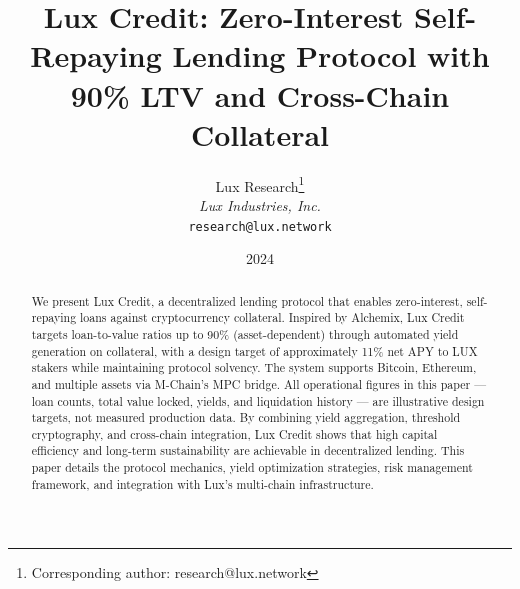 \documentclass[11pt,a4paper]{article}
\title{Lux Credit: Zero-Interest Self-Repaying Lending Protocol with 90\% LTV and Cross-Chain Collateral}
\author{
Lux Research\thanks{Corresponding author: research@lux.network}\\
\textit{Lux Industries, Inc.}\\
\texttt{research@lux.network}
}
\date{2024}
\begin{document}
\luxcoverpage
\begin{abstract}
We present Lux Credit, a decentralized lending protocol that enables zero-interest, self-repaying loans against cryptocurrency collateral. Inspired by Alchemix, Lux Credit targets loan-to-value ratios up to 90\% (asset-dependent) through automated yield generation on collateral, with a design target of approximately 11\% net APY to LUX stakers while maintaining protocol solvency. The system supports Bitcoin, Ethereum, and multiple assets via M-Chain's MPC bridge. All operational figures in this paper --- loan counts, total value locked, yields, and liquidation history --- are illustrative design targets, not measured production data. By combining yield aggregation, threshold cryptography, and cross-chain integration, Lux Credit shows that high capital efficiency and long-term sustainability are achievable in decentralized lending. This paper details the protocol mechanics, yield optimization strategies, risk management framework, and integration with Lux's multi-chain infrastructure.
\end{abstract}


















\end{document}
